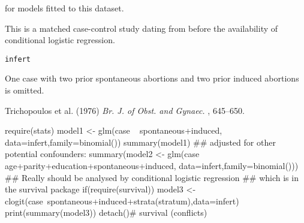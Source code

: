 %
\begin{SeeAlso}\relax
{} for models fitted to this dataset.
\end{SeeAlso}
%
\begin{Description}\relax
This is a matched case-control study dating from before the
availability of conditional logistic regression.
\end{Description}
%
\begin{Usage}
\begin{verbatim}
infert
\end{verbatim}
\end{Usage}
%
\begin{Format}

\end{Format}
%
\begin{Note}\relax
One case with two prior spontaneous abortions and two prior induced
abortions is omitted.
\end{Note}
%
\begin{Source}\relax
Trichopoulos et al. (1976)
\emph{Br. J. of Obst. and Gynaec.} , 645--650.
\end{Source}
%
\begin{Examples}
\begin{ExampleCode}
require(stats)
model1 <- glm(case ~ spontaneous+induced, data=infert,family=binomial())
summary(model1)
## adjusted for other potential confounders:
summary(model2 <- glm(case ~ age+parity+education+spontaneous+induced,
                data=infert,family=binomial()))
## Really should be analysed by conditional logistic regression
## which is in the survival package
if(require(survival)){
  model3 <- clogit(case~spontaneous+induced+strata(stratum),data=infert)
  print(summary(model3))
  detach()# survival (conflicts)
}
\end{ExampleCode}
\end{Examples}
